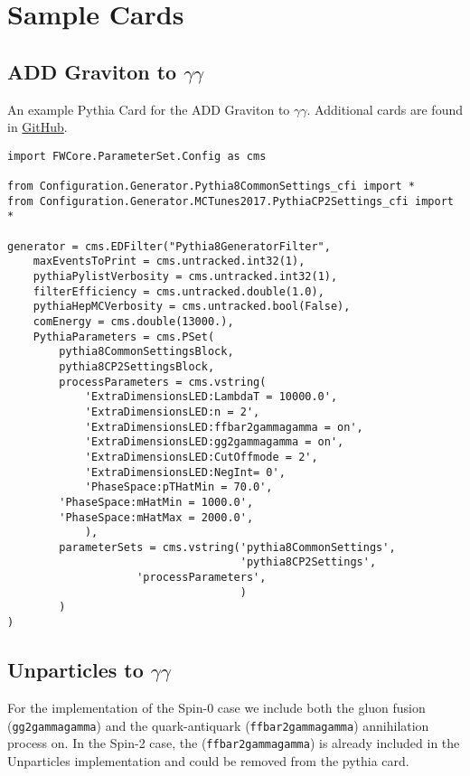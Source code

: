 \chapter{Sample Cards}\label{ch:appendix_sample_cards}
\section{ADD Graviton to $\gamma\gamma$}
An example Pythia Card for the ADD Graviton to $\gamma\gamma$. 
Additional cards are found in \href{https://github.com/uzzielperez/Analyses/tree/master/Analysis_v1/Simulation/Pythia}{GitHub}.

\begin{singlespace}
\begin{small}
\begin{verbatim}
import FWCore.ParameterSet.Config as cms 

from Configuration.Generator.Pythia8CommonSettings_cfi import *
from Configuration.Generator.MCTunes2017.PythiaCP2Settings_cfi import *

generator = cms.EDFilter("Pythia8GeneratorFilter",
    maxEventsToPrint = cms.untracked.int32(1),
    pythiaPylistVerbosity = cms.untracked.int32(1),
    filterEfficiency = cms.untracked.double(1.0),
    pythiaHepMCVerbosity = cms.untracked.bool(False),
    comEnergy = cms.double(13000.),
    PythiaParameters = cms.PSet(
        pythia8CommonSettingsBlock,
        pythia8CP2SettingsBlock,
        processParameters = cms.vstring(
            'ExtraDimensionsLED:LambdaT = 10000.0',
            'ExtraDimensionsLED:n = 2',
            'ExtraDimensionsLED:ffbar2gammagamma = on',
            'ExtraDimensionsLED:gg2gammagamma = on',
            'ExtraDimensionsLED:CutOffmode = 2', 
            'ExtraDimensionsLED:NegInt= 0',
            'PhaseSpace:pTHatMin = 70.0',
	    'PhaseSpace:mHatMin = 1000.0',	    
	    'PhaseSpace:mHatMax = 2000.0', 
            ),  
        parameterSets = cms.vstring('pythia8CommonSettings',
                                    'pythia8CP2Settings', 
				    'processParameters',
                                    )   
        )   
)
\end{verbatim}
\end{small}
\end{singlespace}


\section{Unparticles to $\gamma\gamma$}
\begin{spacing}{2}
For the \PYTHIA implementation of the Spin-0 case we include both the gluon fusion (\texttt{gg2gammagamma}) and the quark-antiquark (\texttt{ffbar2gammagamma}) annihilation process on. In the Spin-2 case, the (\texttt{ffbar2gammagamma}) is already included in the Unparticles implementation and could be removed from the pythia card.

\end{spacing}

